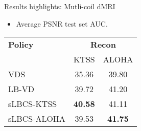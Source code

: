     \begin{frame}{Results highlights: Mutli-coil dMRI}
        \begin{itemize}
            \item Average PSNR test set AUC.
        \end{itemize}
        \begin{center}
        \begin{tabular}{lcc}
            \toprule
            \textbf{Policy} & \multicolumn{2}{c}{\textbf{Recon}}\\
            \cmidrule{2-3}
            & {KTSS}&{ALOHA}\\ 
            \midrule  %
            VDS &35.36&39.80\\
            LB-VD & 39.72&41.20\\
            \midrule
            \midrule
            sLBCS-KTSS& \textbf{40.58}&41.11\\
            sLBCS-ALOHA&39.53&{\textbf{41.75}}\\
            \bottomrule
            \end{tabular}
        \end{center}



\end{frame}
